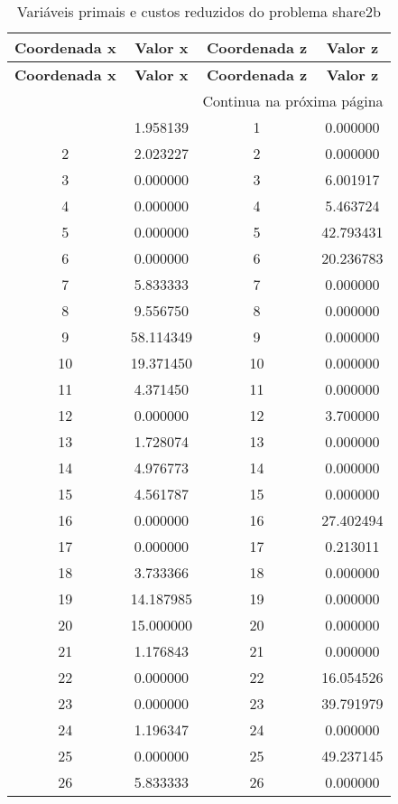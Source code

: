 \documentclass[12pt]{article}
\begin{document}
\begin{longtable}{@{}cccc@{}}
\caption{Variáveis primais e custos reduzidos do problema share2b} \\
\toprule
\textbf{Coordenada x} & \textbf{Valor x} & \textbf{Coordenada z} & \textbf{Valor z} \\
\midrule
\endfirsthead

\toprule
\textbf{Coordenada x} & \textbf{Valor x} & \textbf{Coordenada z} & \textbf{Valor z} \\
\midrule
\endhead

\midrule \multicolumn{4}{r}{{Continua na próxima página}} \\ \midrule
\endfoot

\bottomrule
\endlastfoot
1 & 1.958139 & 1 & 0.000000 \\
2 & 2.023227 & 2 & 0.000000 \\
3 & 0.000000 & 3 & 6.001917 \\
4 & 0.000000 & 4 & 5.463724 \\
5 & 0.000000 & 5 & 42.793431 \\
6 & 0.000000 & 6 & 20.236783 \\
7 & 5.833333 & 7 & 0.000000 \\
8 & 9.556750 & 8 & 0.000000 \\
9 & 58.114349 & 9 & 0.000000 \\
10 & 19.371450 & 10 & 0.000000 \\
11 & 4.371450 & 11 & 0.000000 \\
12 & 0.000000 & 12 & 3.700000 \\
13 & 1.728074 & 13 & 0.000000 \\
14 & 4.976773 & 14 & 0.000000 \\
15 & 4.561787 & 15 & 0.000000 \\
16 & 0.000000 & 16 & 27.402494 \\
17 & 0.000000 & 17 & 0.213011 \\
18 & 3.733366 & 18 & 0.000000 \\
19 & 14.187985 & 19 & 0.000000 \\
20 & 15.000000 & 20 & 0.000000 \\
21 & 1.176843 & 21 & 0.000000 \\
22 & 0.000000 & 22 & 16.054526 \\
23 & 0.000000 & 23 & 39.791979 \\
24 & 1.196347 & 24 & 0.000000 \\
25 & 0.000000 & 25 & 49.237145 \\
26 & 5.833333 & 26 & 0.000000 \\

\end{longtable}
\end{document}
